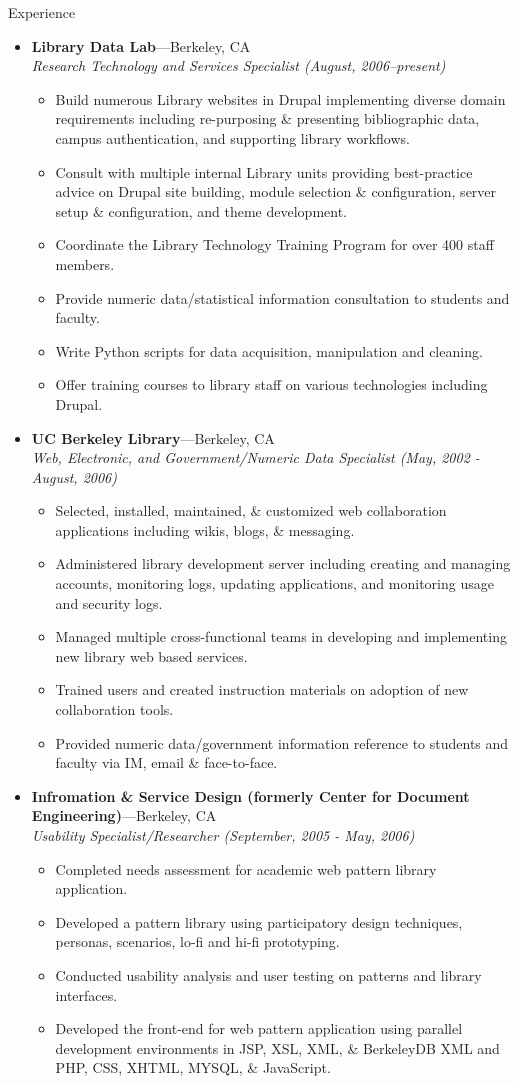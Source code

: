 \documentclass[11pt,oneside]{article}
\newenvironment{ressection}[1]{
	\vspace{4pt}
	{\fontfamily{phv}\selectfont\Large#1}
	\begin{itemize}
	\vspace{3pt}
}{
	\end{itemize}
}
\newcommand{\ressubitem}[1]{
	\vspace{-1pt}
	\item \begin{flushleft} #1 \end{flushleft}
}
\newcommand{\resbigitem}[3]{
	\vspace{-5pt}
	\item
	\textbf{#1}---#2 \\
	\textit{#3}
}
\newenvironment{ressubsec}[3]{
	\resbigitem{#1}{#2}{#3}
	\vspace{-2pt}
	\begin{itemize}
}{
	\end{itemize}
}
\begin{document}
\begin{ressection}{Experience}

	\begin{ressubsec}{Library Data Lab}{Berkeley, CA}{Research Technology and Services Specialist (August, 2006--present)}
		\ressubitem{Build numerous Library websites in Drupal implementing diverse domain requirements including re-purposing \&  presenting  bibliographic data, campus authentication, and supporting library workflows.}
		\ressubitem{Consult with multiple internal Library units providing best-practice advice on Drupal site building, module selection \& configuration, server setup \& configuration, and theme development.}
		\ressubitem{Coordinate the Library Technology Training Program for over 400 staff members.}
		\ressubitem{Provide numeric data/statistical information consultation to students and faculty.}
		\ressubitem{Write Python scripts for data acquisition, manipulation and cleaning.}
		\ressubitem{Offer training courses to library staff on various technologies including Drupal.}
	\end{ressubsec}

	\begin{ressubsec}{UC Berkeley Library}{Berkeley, CA}{Web, Electronic, and Government/Numeric Data Specialist (May, 2002 - August, 2006)}
		\ressubitem{Selected, installed, maintained, \& customized web collaboration applications including wikis, blogs, \& messaging.}
		\ressubitem{Administered library development server including creating and managing accounts, monitoring logs, updating applications, and monitoring usage and security logs.}
		\ressubitem{Managed multiple cross-functional teams in developing and implementing new library web based services.}
		\ressubitem{Trained users and created instruction materials on adoption of new collaboration tools.}
		\ressubitem{Provided numeric data/government information reference to students and faculty via IM, email \& face-to-face.}		
	\end{ressubsec}
	
	\begin{ressubsec}{Infromation \& Service Design (formerly Center for Document Engineering)}{Berkeley, CA}{Usability Specialist/Researcher (September, 2005 - May, 2006)}
	  \ressubitem{Completed needs assessment for academic web pattern library application.}
	  \ressubitem{Developed a pattern library using participatory design techniques, personas, scenarios, lo-fi and hi-fi prototyping.}
	  \ressubitem{Conducted usability analysis and user testing on patterns and library interfaces.}
	  \ressubitem{Developed the front-end for web pattern application using parallel development environments in JSP, XSL, XML, \& BerkeleyDB XML and PHP, CSS, XHTML, MYSQL, \& JavaScript.}
	\end{ressubsec}
\end{ressection}
\end{document}
